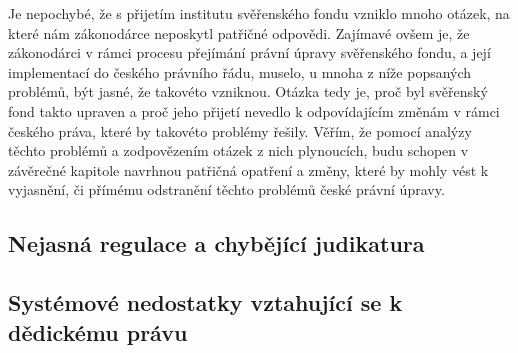 \documentclass{article}
\begin{document}
Je nepochybé, že s přijetím institutu svěřenského fondu vzniklo mnoho otázek, na které nám zákonodárce neposkytl patřičné odpovědi. Zajímavé ovšem je, že zákonodárci v rámci procesu přejímání právní úpravy svěřenského fondu, a její implementací do českého právního řádu, muselo, u mnoha z níže popsaných problémů, být jasné, že takovéto vzniknou. Otázka tedy je, proč byl svěřenský fond takto upraven a proč jeho přijetí nevedlo k odpovídajícím změnám v rámci českého práva, které by takovéto problémy řešily. Věřím, že pomocí analýzy těchto problémů a zodpovězením otázek z nich plynoucích, budu schopen v závěrečné kapitole navrhnou patřičná opatření a změny, které by mohly vést k vyjasnění, či přímému odstranění těchto problémů české právní úpravy.\\
\newpage


\subsection{Nejasná regulace a chybějící judikatura}

\subsection{Systémové nedostatky vztahující se k dědickému právu}

\end{document}
